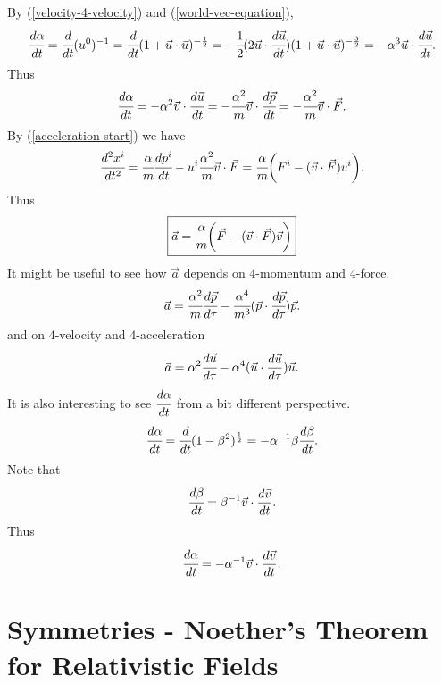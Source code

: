 \documentclass[main.tex]{subfiles}
\begin{document}
By (\ref{velocity-4-velocity}) and (\ref{world-vec-equation}), 
\begin{equation}
\cfrac{d\alpha}{dt} = \cfrac{d}{dt}(u^0)^{-1} 
= \cfrac{d}{dt}(1 + \vec{u}\cdot\vec{u})^{-\frac{1}{2}} 
= -\cfrac{1}{2}(2\vec{u}\cdot\cfrac{d\vec{u}}{dt})(1 + \vec{u}\cdot\vec{u})^{-\frac{3}{2}} = - \alpha^3\vec{u}\cdot\cfrac{d\vec{u}}{dt}.
\end{equation}
Thus
\begin{equation}
\cfrac{d\alpha}{dt} = - \alpha^2\vec{v}\cdot\cfrac{d\vec{u}}{dt} = - \cfrac{\alpha^2}{m}\vec{v}\cdot \cfrac{d\vec{p}}{dt} = - \cfrac{\alpha^2}{m}\vec{v}\cdot \vec{F}.
\end{equation}
By (\ref{acceleration-start}) we have
\begin{equation}
\cfrac{d^2 x^i}{dt^2} = \cfrac{\alpha}{m}\cfrac{dp^i}{dt} - u^i \cfrac{\alpha^2}{m}\vec{v}\cdot \vec{F} 
= \cfrac{\alpha}{m} \bigg(F^i - (\vec{v}\cdot\vec{F})v^i\bigg).
\end{equation}
Thus
\begin{equation}
\boxed{
\vec{a} = \cfrac{\alpha}{m} \bigg(\vec{F} - (\vec{v}\cdot\vec{F})\vec{v}\bigg)}
\end{equation}
It might be useful to see how $\vec{a}$ depends on $4$-momentum and $4$-force.
\begin{equation}
\vec{a} = \cfrac{\alpha^2}{m}\cfrac{d\vec{p}}{d\tau} - \cfrac{\alpha^4}{m^3}(\vec{p}\cdot\cfrac{d\vec{p}}{d\tau})\vec{p}.
\end{equation}
and on $4$-velocity and $4$-acceleration
\begin{equation}
\vec{a} = \alpha^2 \cfrac{d\vec{u}}{d\tau} - \alpha^4(\vec{u}\cdot\frac{d\vec{u}}{d\tau})\vec{u}.
\end{equation}
It is also interesting to see $\cfrac{d\alpha}{dt}$ from a bit different perspective.
\begin{equation}
\cfrac{d\alpha}{dt} = \cfrac{d}{dt}(1 - \beta^2)^{\frac{1}{2}} = -\alpha^{-1}\beta\cfrac{d\beta}{dt}.
\end{equation}
Note that
\begin{equation}
\cfrac{d\beta}{dt} = \beta^{-1}\vec{v}\cdot \frac{d\vec{v}}{dt}.
\end{equation}
Thus
\begin{equation}
\cfrac{d\alpha}{dt} = -\alpha^{-1} \vec{v}\cdot \frac{d\vec{v}}{dt}.
\end{equation}
\section{Symmetries - Noether's Theorem for Relativistic Fields}
\end{document}
